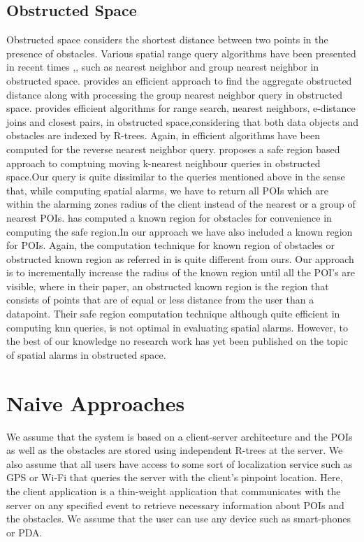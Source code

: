 \documentclass{sig-alternate}
\begin{document}
\subsection{Obstructed Space} 
Obstructed space considers the shortest distance between two points in the presence of obstacles.\cite{deberg} Various spatial range query algorithms have been presented in recent times \cite{obst1},\cite{obst2},\cite{ognn} such as nearest neighbor and group nearest neighbor in obstructed space.\cite{ognn} provides an efficient approach to find the aggregate obstructed distance along with processing the group nearest neighbor query in obstructed space.\cite{obst1} provides efficient algorithms for range search, nearest neighbors, e-distance joins and closest pairs, in obstructed space,considering that both data objects and obstacles are indexed by R-trees. Again, in \cite{obst2} efficient algorithms have been computed for the reverse nearest neighbor query. \cite{mknn} proposes a safe region based approach to comptuing moving k-nearest neighbour queries in obstructed space.Our query is quite dissimilar to the queries mentioned above in the sense that, while computing spatial alarms, we have to return all POIs which are within the alarming zones radius of the client instead of the nearest or a group of nearest POIs. \cite{mknn} has computed a known region for obstacles for convenience in computing the safe region.In our approach we have also included a known region for POIs. Again, the computation technique for known region of obstacles or obstructed known region as referred in \cite{mknn} is quite different from ours. Our approach is to incrementally increase the radius of the known region until all the POI's are visible, where in their paper, an obstructed known region is the region that consists of points that are of equal or less distance from the user than a datapoint. Their safe region computation technique although quite efficient in computing knn queries, is not optimal in evaluating spatial alarms. However, to the best of our knowledge no research work has yet been published on the topic of spatial alarms in obstructed space.\\


\section{Naive Approaches}
We assume that the system is based on a client-server architecture and the POIs as well as the obstacles are stored using independent R-trees at the server. We also assume that all users have access to some sort of localization service such as GPS or Wi-Fi that queries the server with the client's pinpoint location. Here, the client application is a thin-weight application that communicates with the server on any specified event to retrieve necessary information about POIs and the obstacles. We assume that the user can use any device such as smart-phones or PDA.\\
\end{document}
